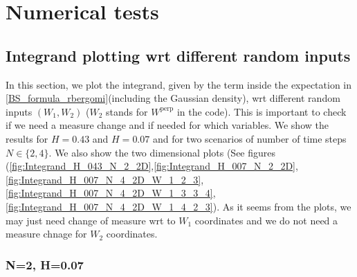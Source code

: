 \documentclass[11pt]{article}
\begin{document}
%
%






\section{Numerical tests}\label{sec:Numerical tests}

\subsection{Integrand plotting wrt different random inputs } \label{sec:Integrand plotting wrt different random inputs}
In this section, we plot the integrand, given by the term inside the expectation in \eqref{BS_formula_rbergomi}(including the Gaussian density), wrt different random inputs $(W_1,W_2)$ ($W_2$ stands for $W^\text{perp}$ in the code). This is important to check if we need a measure change and if needed for which variables. We show the results for $H=0.43$ and $H=0.07$ and for two scenarios of number of time steps $N \in \{2,4\}$. We also show the two dimensional plots (See figures (\ref{fig:Integrand_H_043_N_2_2D},\ref{fig:Integrand_H_007_N_2_2D},\ref{fig:Integrand_H_007_N_4_2D_W_1_2_3},\ref{fig:Integrand_H_007_N_4_2D_W_1_3_3_4},\ref{fig:Integrand_H_007_N_4_2D_W_1_4_2_3}). As it seems from the plots, we may just need change of measure wrt to $W_1$ coordinates and we do not need a measure chnage for $W_2$ coordinates. 



\subsubsection{N=2, H=0.07}
\end{document}
